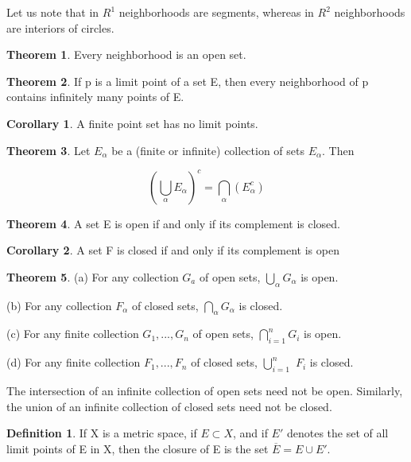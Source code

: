 \documentclass{article}
\theoremstyle{definition}
\newtheorem{defi}{Definition}
\newtheorem{theo}{Theorem}
\newtheorem{coro}{Corollary}
\theoremstyle{remark}
\begin{document}
	Let us note that in $R^1$ neighborhoods are segments, whereas in $R^2$ neighborhoods are interiors of circles.
	
	
	\begin{theo}
		Every neighborhood is an open set.
	\end{theo}
	
	\begin{theo}
		If p is a limit point of a set E, then every neighborhood of p contains infinitely many points of E.
	\end{theo}
	
	\begin{coro}
		A finite point set has no limit points.
	\end{coro}
	
	\begin{theo}
		Let ${E_\alpha}$ be a (finite or infinite) collection of sets $E_\alpha$. Then 
		
		\begin{equation}
			(\bigcup_\alpha E_\alpha)^c=\bigcap_\alpha(E_\alpha^c)
		\end{equation}
	\end{theo}
	
	\begin{theo}
		A set E is open if and only if its complement is closed.
	\end{theo}
	
	\begin{coro}
		A set F is closed if and only if its complement is open
	\end{coro}
	
	\begin{theo}
		(a) For any collection ${G_a}$ of open sets, $\bigcup_\alpha G_\alpha$ is open.
		
		(b) For any collection ${F_\alpha}$ of closed sets, $\bigcap_\alpha G_\alpha$ is closed.
	
		(c) For any finite collection $G_1,...,G_n$ of open sets, $\bigcap_{i=1}^n G_i$ is open.
		
		(d) For any finite collection $F_1,...,F_n$ of closed sets, $\bigcup_{i=1}^n$ $F_i$ is closed.
		
	\end{theo}
	
	The intersection of an infinite collection of open sets need not be open. Similarly, the union of an infinite collection of closed sets need not be closed.
	
	\begin{defi}
		If X is a metric space, if $E\subset X$, and if $E'$ denotes the set of all limit points of E in X, then the closure of E is the set $\overline{E}=E\cup E'$.
	\end{defi}
	
\end{document}
